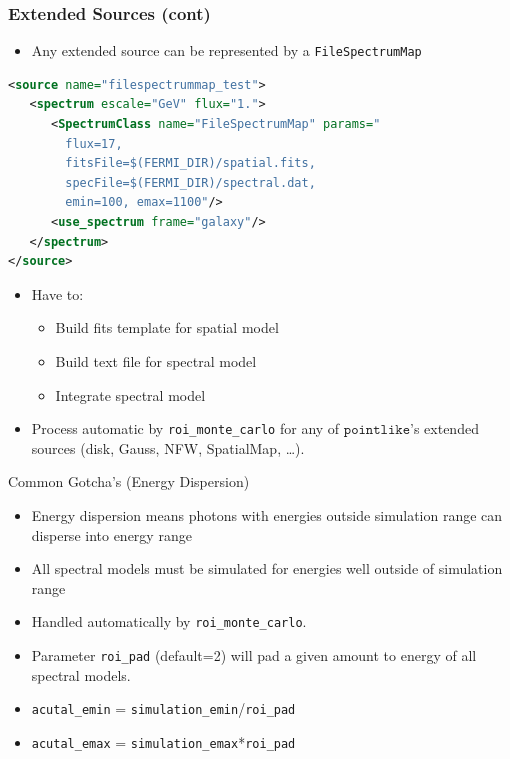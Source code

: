 \documentclass[12pt]{beamer}
\newcommand{\pointlike}{\ensuremath{\mathtt{pointlike}}\xspace}
\newcommand{\roimc}{\texttt{roi\_monte\_carlo}\xspace}
\newcommand{\FileSpectrumMap}{\texttt{FileSpectrumMap}\xspace}
\begin{document}
\begin{frame}[fragile]
\frametitle{Extended Sources (cont)}

  \begin{itemize}
    \item Any extended source can be represented by a \FileSpectrumMap
  \end{itemize}
\begin{lstlisting}[language=XML]
<source name="filespectrummap_test">
   <spectrum escale="GeV" flux="1.">
      <SpectrumClass name="FileSpectrumMap" params="
        flux=17,
        fitsFile=$(FERMI_DIR)/spatial.fits,
        specFile=$(FERMI_DIR)/spectral.dat,
        emin=100, emax=1100"/>
      <use_spectrum frame="galaxy"/>
   </spectrum>
</source>
\end{lstlisting}
  \begin{itemize}
    \item Have to:
    \begin{itemize}
    \item Build fits template for spatial model
    \item Build text file for spectral model
    \item Integrate spectral model
    \end{itemize}
  \item Process automatic by \roimc for any of \pointlike's extended
    sources (disk, Gauss, NFW, SpatialMap, \dots).
  \end{itemize}
\end{frame}


\begin{frame}{Common Gotcha's (Energy Dispersion)}
  \begin{itemize}
        \item Energy dispersion means photons with energies outside simulation range can
          disperse into energy range
        \item All spectral models must be simulated for energies well outside of simulation range
        \item Handled automatically by \roimc. 
        \item Parameter \texttt{roi\_pad} (default=2) will pad a given
          amount to energy of all spectral models.
        \item \texttt{acutal\_emin} = \texttt{simulation\_emin}/\texttt{roi\_pad}
        \item \texttt{acutal\_emax} = \texttt{simulation\_emax}*\texttt{roi\_pad}
      \end{itemize}
\end{frame}
\end{document}

